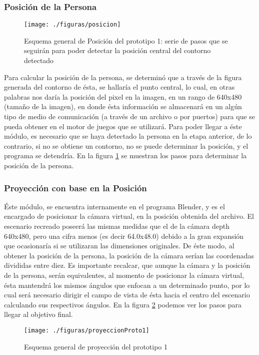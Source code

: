 \documentclass[a4paper,openright,12pt]{report}
\begin{document}
\subsubsection{Posición de la Persona}
\begin{figure}[th]
	\centering
	\texttt{[image: ./figuras/posicion]}
	\caption[Esquema general de Posición del prototipo 1]{Esquema general de Posición del prototipo 1: serie de pasos que se seguirán para poder detectar la posición central del contorno detectado} \label{fig:posicion}
\end{figure}
Para calcular la posición de la persona, se determinó que a través de la figura generada del contorno de ésta, se hallaría el punto central, lo cual, en otras palabras nos daría la posición del pixel en la imagen, en un rango de 640x480 (tamaño de la imagen), en donde ésta información se almacenará en un algún tipo de medio de comunicación (a través de un archivo o por puertos) para que se pueda obtener en el motor de juegos que se utilizará. Para poder llegar a éste módulo, es necesario que se haya detectado la persona en la etapa anterior, de lo contrario, si no se obtiene un contorno, no se puede determinar la posición, y el programa se detendría. En la figura \ref{fig:posicion} se muestran los pasos para determinar la posición de la persona.

\subsubsection{Proyección con base en la Posición}
Éste módulo, se encuentra internamente en el programa Blender\textcopyright, y es el encargado de posicionar la cámara virtual, en la posición obtenida del archivo. El escenario recreado poseerá las mismas medidas que el de la cámara depth 640x480, pero una cifra menos (es decir 64.0x48.0) debido a la gran expansión que ocasionaría si se utilizaran las dimensiones originales. De éste modo, al obtener la posición de la persona, la posición de la cámara serían las coordenadas divididas entre diez. Es importante recalcar, que aunque la cámara y la posición de la persona, serán equivalentes, al momento de posicionar la cámara virtual, ésta mantendrá los mismos ángulos que enfocan a un determinado punto, por lo cual será necesario dirigir el campo de vista de ésta hacia el centro del escenario calculando sus respectivos ángulos. En la figura \ref{fig:proyeccionProto1}  podemos ver los pasos para llegar al objetivo final.
\vspace*{10mm}
\begin{figure}[th]
	\centering
	\texttt{[image: ./figuras/proyeccionProto1]}
	\caption{Esquema general de proyección del prototipo 1} \label{fig:proyeccionProto1}
\end{figure}
\end{document}

